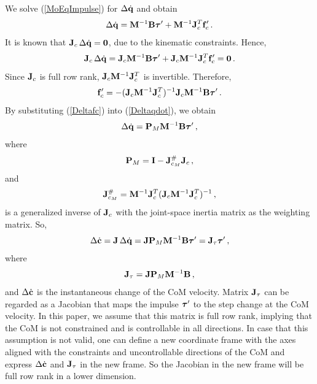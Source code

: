 We solve (\ref{MoEqImpulse}) for $\Delta \dot{\mathbf{q}}$ and obtain
%
\begin{equation}
  \Delta \dot{\mathbf{q}} = \mathbf{M}^{-1} \mathbf{B} \boldsymbol{\tau}' + \mathbf{M}^{-1} \mathbf{J}_c^T \mathbf{f}'_c \, .
  \label{Deltaqdot}
\end{equation}
%
It is known that $\mathbf{J}_c \, \Delta \dot{\mathbf{q}} = \mathbf{0}$, due to the kinematic
constraints.  Hence,
%
\begin{equation}
  \mathbf{J}_c \, \Delta \dot{\mathbf{q}} = \mathbf{J}_c \mathbf{M}^{-1} \mathbf{B} \boldsymbol{\tau}' + \mathbf{J}_c \mathbf{M}^{-1}
  \mathbf{J}_c^T \mathbf{f}'_c = \mathbf{0} \, .
  \label{JcDeltaqdot=Eq=0}
\end{equation}
%
Since $\mathbf{J}_c$ is full row rank, $\mathbf{J}_c \mathbf{M}^{-1} \mathbf{J}_c^T$ is invertible.
Therefore,
%
\begin{equation}
  \mathbf{f}'_c = -(\mathbf{J}_c \mathbf{M}^{-1}\mathbf{J}_c^T)^{-1} \mathbf{J}_c \mathbf{M}^{-1} \mathbf{B} \boldsymbol{\tau}' \, .
  \label{Deltafc}
\end{equation}
%
By substituting (\ref{Deltafc}) into (\ref{Deltaqdot}), we obtain
%
\begin{equation}
  \Delta \dot{\mathbf{q}} = \mathbf{P}_M \mathbf{M}^{-1} \mathbf{B} \boldsymbol{\tau}' \, ,
  \label{Deltaqdotfinal}
\end{equation}
%
where
%
\begin{equation}
  \mathbf{P}_M = \mathbf{I} - \mathbf{J}_{c_M}^{\#}\mathbf{J}_c \, ,
  \label{PH}
\end{equation}
%
and
%
\begin{equation}
  \mathbf{J}_{c_M}^{\#} = \mathbf{M}^{-1} \mathbf{J}_c^T (\mathbf{J}_c \mathbf{M}^{-1} \mathbf{J}_c^T)^{-1} \, ,
  \label{JCHpinv}
\end{equation}
%
is a generalized inverse of $\mathbf{J}_c$ with the joint-space inertia matrix as the
weighting matrix.  So,
%
\begin{equation}
  \Delta \dot{\mathbf{c}} = \mathbf{J} \, \Delta \dot{\mathbf{q}} = \mathbf{J} \mathbf{P}_M \mathbf{M}^{-1} \mathbf{B} \boldsymbol{\tau}' =
  \mathbf{J}_\tau \boldsymbol{\tau}' \, ,
  \label{DeltacdotDeltatau}
\end{equation}
%
where
%
\begin{equation}
  \mathbf{J}_\tau = \mathbf{J} \mathbf{P}_M \mathbf{M}^{-1} \mathbf{B} \, ,
  \label{Jtau}
\end{equation}
%
and $\Delta \dot{\mathbf{c}}$ is the instantaneous change of the CoM velocity.
Matrix $\mathbf{J}_\tau$ can be regarded as a Jacobian that maps the impulse $\boldsymbol{\tau}'$
to the step change at the CoM velocity.  In this paper, we assume that this
matrix is full row rank, implying that the CoM is not constrained and is
controllable in all directions.  In case that this assumption is not valid,
one can define a new coordinate frame with the axes aligned with the
constraints and uncontrollable directions of the CoM and express $\Delta
\dot{\mathbf{c}}$ and $\mathbf{J}_\tau$ in the new frame.  So the Jacobian in the new frame
will be full row rank in a lower dimension.


